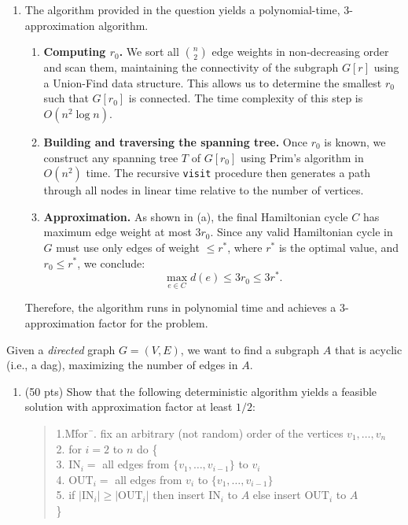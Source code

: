 \documentclass[11pt]{article}
\begin{document}
\begin{description}
\begin{enumerate}
Thus, every edge in the constructed cycle $C$ has weight at most $3r_0$.

\item[(b)]
The algorithm provided in the question yields a polynomial-time, 3-approximation algorithm.

\begin{enumerate}
  \item[1.] \textbf{Computing \(r_0\).}  
  We sort all \(\binom{n}{2}\) edge weights in non-decreasing order and scan them, maintaining the connectivity of the subgraph \(G[r]\) using a Union-Find data structure. This allows us to determine the smallest \(r_0\) such that \(G[r_0]\) is connected. The time complexity of this step is \(O(n^2 \log n)\).

  \item[2.] \textbf{Building and traversing the spanning tree.}  
  Once \(r_0\) is known, we construct any spanning tree \(T\) of \(G[r_0]\) using Prim's algorithm in \(O(n^2)\) time. The recursive \texttt{visit} procedure then generates a path through all nodes in linear time relative to the number of vertices.

  \item[3.] \textbf{Approximation.}  
  As shown in (a), the final Hamiltonian cycle \(C\) has maximum edge weight at most \(3r_0\). Since any valid Hamiltonian cycle in \(G\) must use only edges of weight \(\le r^*\), where \(r^*\) is the optimal value, and \(r_0 \le r^*\), we conclude:
  \[
      \max_{e \in C} d(e) \le 3r_0 \le 3r^*.
  \]
\end{enumerate}

Therefore, the algorithm runs in polynomial time and achieves a 3-approximation factor for the problem.


\end{enumerate}



\newpage
\item[Problem 10.3:]
Given a {\em directed\/} graph $G=(V,E)$, we want to find
a subgraph $A$ that is acyclic (i.e., a dag), maximizing the
number of edges in $A$. 
\begin{enumerate}
\item[(a)] (50 pts) Show that the following deterministic algorithm yields
a feasible solution with approximation factor at least $1/2$:
\begin{quote}
\begin{tabbing}
1.M\= for\ \=.\> fix an arbitrary (not random) order of the vertices $v_1,\ldots, v_n$\\
2.\> for $i=2$ to $n$ do \{\\
3.\>\> $\textrm{IN}_i =$ all edges from $\{v_1,\ldots,v_{i-1}\}$ to $v_i$\\
4.\>\> $\textrm{OUT}_i =$ all edges from $v_i$ to $\{v_1,\ldots,v_{i-1}\}$\\
5.\>\> if $|\textrm{IN}_i|\ge |\textrm{OUT}_i|$ then insert $\textrm{IN}_i$ to $A$ else
insert $\textrm{OUT}_i$ to $A$\\
\>\}
\end{tabbing}
\end{quote}


\end{enumerate}
\end{description}
\end{document}
